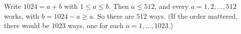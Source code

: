 Write $1024=a+b$ with $1\le a\le b$. Then $a\le512$, and every $a=1,2,\dots,512$ works, with $b=1024-a\ge a$. So there are $\boxed{512}$ ways. (If the order mattered, there would be $1023$ ways, one for each $a=1,\dots,1023$.)
